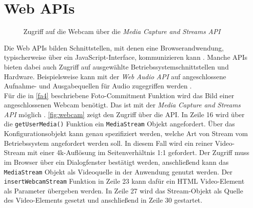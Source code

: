 \section{Web APIs}
\label{sec:web-apis}

\begin{figure}
  
  \caption{Zugriff auf die Webcam über die \emph{Media Capture and Streams API}}
  \label{fig:webcam}
\end{figure}

Die Web APIs bilden Schnittstellen, mit denen eine Browserandwendung, typischerweise über ein JavaScript-Interface,
kommunizieren kann \cite{web-apis}. Manche APIs bieten dabei auch Zugriff auf ausgewählte 
Betriebssystemschnittstellen und Hardware. Beispielsweise kann mit der \emph{Web Audio API} auf 
angeschlossene Aufnahme- und Ausgabequellen für Audio zugegriffen werden \cite{web-audio-api}.\\
Für die in \ref{fa4} beschriebene
Foto-Commitment Funktion wird das Bild einer angeschlossenen Webcam benötigt. Das ist mit der \emph{Media Capture and 
Streams API} möglich \cite{media-stream}. \autoref{fig:webcam} zeigt den Zugriff über die API. In Zeile 16 wird 
über die \texttt{getUserMedia()} Funktion ein \texttt{MediaStream} Objekt angefordert. Über das Konfigurationsobjekt
kann genau spezifiziert werden, welche Art von Stream vom Betriebssystem angefordert werden soll. In diesem Fall
wird ein reiner Video-Stream mit einer 4k-Auflösung im Seitenverhältnis 1:1 gefordert. Der Zugriff muss 
im Browser über ein Dialogfenster bestätigt werden, anschließend kann das \texttt{MediaStream} Objekt als
Videoquelle in der Anwendung genutzt werden. Der \texttt{insertWebcamStream} Funktion in Zeile 23 kann dafür
ein HTML Video-Element als Parameter übergeben werden. In Zeile 27 wird das Stream-Objekt als Quelle
des Video-Elements gesetzt und anschließend in Zeile 30 gestartet.

\iffalse
- Web USB
- 
\fi